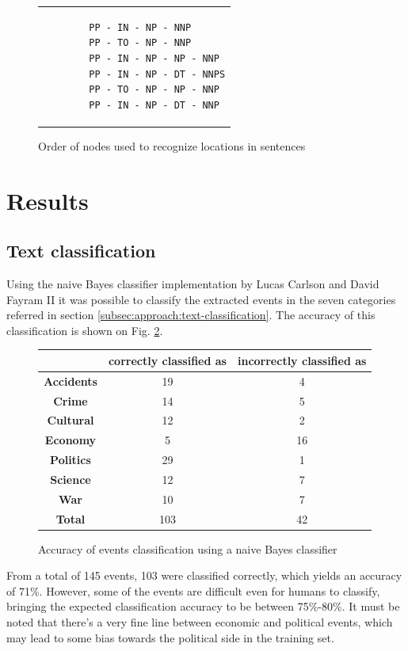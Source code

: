 \documentclass{llncs}
\begin{document}
\begin{figure}[h!]
	\centering
	\begin{tabular}{p{4cm}}
		\begin{verbatim}
		PP - IN - NP - NNP
		PP - TO - NP - NNP
		PP - IN - NP - NP - NNP
		PP - IN - NP - DT - NNPS
		PP - TO - NP - NP - NNP
		PP - IN - NP - DT - NNP
		\end{verbatim}
	\end{tabular}
	\caption{Order of nodes used to recognize locations in sentences}
	\label{fig:nodes-order}
\end{figure}

\section{Results}

\subsection{Text classification}

Using the naive Bayes classifier implementation by Lucas Carlson and David Fayram II\cite{classifier} it was possible to classify the extracted events in the seven categories referred in section \ref{subsec:approach:text-classification}. The accuracy of this classification is shown on Fig. \ref{fig:classifier-accuracy}.

\begin{figure}[h!]
	\centering
	\begin{tabular}{c|c|c}
	 & \textbf{correctly classified as} & \textbf{incorrectly classified as} \\
	\hline
	\textbf{Accidents} & 19 & 4 \\
	\textbf{Crime}     & 14 & 5 \\
	\textbf{Cultural}  & 12 & 2 \\
	\textbf{Economy}   & 5 & 16 \\
	\textbf{Politics}  & 29 & 1 \\
	\textbf{Science}   & 12 & 7 \\
	\textbf{War}       & 10 & 7 \\
	\hline
	\textbf{Total}     & 103 & 42 \\
	\end{tabular}
	\caption{Accuracy of events classification using a naive Bayes classifier}
	\label{fig:classifier-accuracy}
\end{figure}

From a total of 145 events, 103 were classified correctly, which yields an accuracy of 71\%. However, some of the events are difficult even for humans to classify, bringing the expected classification accuracy to be between 75\%-80\%. It must be noted that there's a very fine line between economic and political events, which may lead to some bias towards the political side in the training set.
\end{document}

